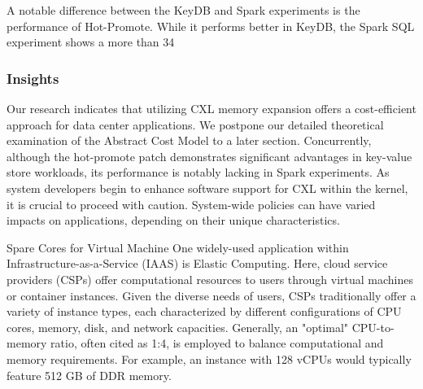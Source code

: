 A notable difference between the KeyDB and Spark experiments is the performance of Hot-Promote. While it performs better in KeyDB, the Spark SQL experiment shows a more than 34%

\subsubsection{Insights}

Our research indicates that utilizing CXL memory expansion offers a cost-efficient approach for data center applications. We postpone our detailed theoretical examination of the Abstract Cost Model to a later section. Concurrently, although the hot-promote patch demonstrates significant advantages in key-value store workloads, its performance is notably lacking in Spark experiments. As system developers begin to enhance software support for CXL within the kernel, it is crucial to proceed with caution. System-wide policies can have varied impacts on applications, depending on their unique characteristics.


Spare Cores for Virtual Machine
One widely-used application within Infrastructure-as-a-Service (IAAS) is Elastic Computing. Here, cloud service providers (CSPs) offer computational resources to users through virtual machines or container instances. Given the diverse needs of users, CSPs traditionally offer a variety of instance types, each characterized by different configurations of CPU cores, memory, disk, and network capacities. Generally, an "optimal" CPU-to-memory ratio, often cited as 1:4, is employed to balance computational and memory requirements. For example, an instance with 128 vCPUs would typically feature 512 GB of DDR memory.

